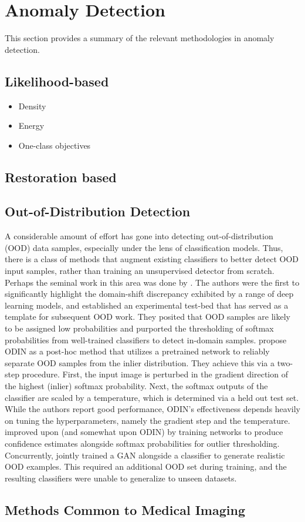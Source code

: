 \section{Anomaly Detection}

This section provides a summary of the relevant methodologies in anomaly detection.

\subsection{Likelihood-based}
\begin{itemize}
    \item Density 
    \item Energy
    \item One-class objectives
\end{itemize}

\subsection{Restoration based}

\subsection{Out-of-Distribution Detection}
A considerable amount of effort has gone into detecting out-of-distribution (OOD) data samples, especially under the lens of classification models. Thus, there is a class of methods that augment existing classifiers to better detect OOD input samples, rather than training an unsupervised detector from scratch. Perhaps the seminal work in this area was done by \cite{Hendrycks2019}. The authors were the first to significantly highlight the domain-shift discrepancy exhibited by a range of deep learning models, and established an experimental test-bed that has served as a template for subsequent OOD work. They posited that OOD samples are likely to be assigned low probabilities and purported the thresholding of softmax probabilities from well-trained classifiers to detect in-domain samples. \cite{Liang2017} propose ODIN as a post-hoc method that utilizes a pretrained network to reliably separate OOD samples from the inlier distribution. They achieve this via a two-step procedure. First, the input image is perturbed in the gradient direction of the highest (inlier) softmax probability. Next, the softmax outputs of the classifier are scaled by a temperature, which is determined via a held out test set. While the authors report good performance, ODIN's effectiveness depends heavily on tuning the hyperparameters, namely the gradient step and the temperature. \cite{devries2018learning} improved upon \cite{Hendrycks2019} (and somewhat upon ODIN) by training networks to produce confidence estimates alongside softmax probabilities for outlier thresholding. Concurrently, \cite{Lee2018} jointly trained a GAN alongside a classifier to generate realistic OOD examples. This required an additional OOD set during training, and the resulting classifiers were unable to generalize to unseen datasets.


\subsection{Methods Common to Medical Imaging}

